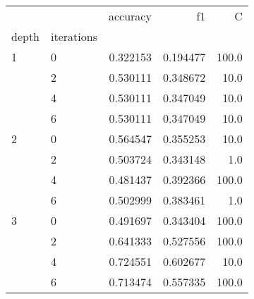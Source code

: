 \begin{tabular}{llrrr}
\toprule
  &   &  accuracy &        f1 &      C \\
depth & iterations &           &           &        \\
\midrule
1 & 0 &  0.322153 &  0.194477 &  100.0 \\
  & 2 &  0.530111 &  0.348672 &   10.0 \\
  & 4 &  0.530111 &  0.347049 &   10.0 \\
  & 6 &  0.530111 &  0.347049 &   10.0 \\
2 & 0 &  0.564547 &  0.355253 &   10.0 \\
  & 2 &  0.503724 &  0.343148 &    1.0 \\
  & 4 &  0.481437 &  0.392366 &  100.0 \\
  & 6 &  0.502999 &  0.383461 &    1.0 \\
3 & 0 &  0.491697 &  0.343404 &  100.0 \\
  & 2 &  0.641333 &  0.527556 &  100.0 \\
  & 4 &  0.724551 &  0.602677 &   10.0 \\
  & 6 &  0.713474 &  0.557335 &  100.0 \\
\bottomrule
\end{tabular}
